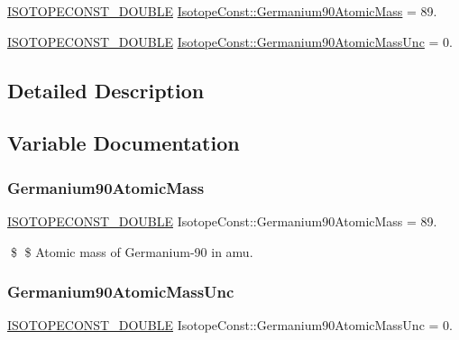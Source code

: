 \begin{DoxyCompactItemize}
\item 
\mbox{\hyperlink{group___isotope_const-_macros_ga8f45a7272ce02c0b4c65c44636ed719a}{I\+S\+O\+T\+O\+P\+E\+C\+O\+N\+S\+T\+\_\+\+D\+O\+U\+B\+LE}} \mbox{\hyperlink{group___isotope_const-_germanium-_ge90_ga55f8f59d30fe5c90f8ce474c975ebe37}{Isotope\+Const\+::\+Germanium90\+Atomic\+Mass}} = 89.
\item 
\mbox{\hyperlink{group___isotope_const-_macros_ga8f45a7272ce02c0b4c65c44636ed719a}{I\+S\+O\+T\+O\+P\+E\+C\+O\+N\+S\+T\+\_\+\+D\+O\+U\+B\+LE}} \mbox{\hyperlink{group___isotope_const-_germanium-_ge90_gacc8df08324ace0748fda5e73506ff99c}{Isotope\+Const\+::\+Germanium90\+Atomic\+Mass\+Unc}} = 0.
\end{DoxyCompactItemize}


\subsection{Detailed Description}


\subsection{Variable Documentation}
\mbox{\label{group___isotope_const-_germanium-_ge90_ga55f8f59d30fe5c90f8ce474c975ebe37}} 
\subsubsection{\texorpdfstring{Germanium90\+Atomic\+Mass}{Germanium90AtomicMass}}
{\footnotesize\ttfamily \mbox{\hyperlink{group___isotope_const-_macros_ga8f45a7272ce02c0b4c65c44636ed719a}{I\+S\+O\+T\+O\+P\+E\+C\+O\+N\+S\+T\+\_\+\+D\+O\+U\+B\+LE}} Isotope\+Const\+::\+Germanium90\+Atomic\+Mass = 89.}

\$ \$ Atomic mass of Germanium-\/90 in amu. \mbox{\label{group___isotope_const-_germanium-_ge90_gacc8df08324ace0748fda5e73506ff99c}} 
\subsubsection{\texorpdfstring{Germanium90\+Atomic\+Mass\+Unc}{Germanium90AtomicMassUnc}}
{\footnotesize\ttfamily \mbox{\hyperlink{group___isotope_const-_macros_ga8f45a7272ce02c0b4c65c44636ed719a}{I\+S\+O\+T\+O\+P\+E\+C\+O\+N\+S\+T\+\_\+\+D\+O\+U\+B\+LE}} Isotope\+Const\+::\+Germanium90\+Atomic\+Mass\+Unc = 0.}


